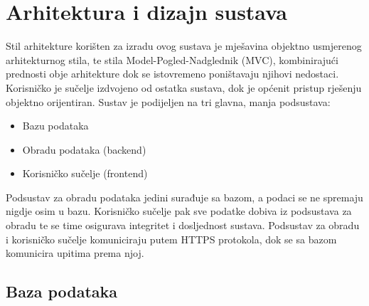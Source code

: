 \chapter{Arhitektura i dizajn sustava}
\setlength{\headheight}{14.49998pt}		


Stil arhitekture korišten za izradu ovog sustava je mješavina objektno usmjerenog arhitekturnog stila, te stila Model-Pogled-Nadglednik (MVC), kombinirajući prednosti obje arhitekture dok se istovremeno poništavaju njihovi nedostaci. Korisničko je sučelje izdvojeno od ostatka sustava, dok je općenit pristup rješenju objektno orijentiran. Sustav je podijeljen na tri glavna, manja podsustava:
\begin{itemize}
\item Bazu podataka
\item Obradu podataka (backend)
\item Korisničko sučelje (frontend)
\end{itemize}
Podsustav za obradu podataka jedini surađuje sa bazom, a podaci se ne spremaju nigdje osim u bazu. Korisničko sučelje pak sve podatke dobiva iz podsustava za obradu te se time osigurava integritet i dosljednost sustava.
Podsustav za obradu i korisničko sučelje komuniciraju putem HTTPS protokola, dok se sa bazom komunicira upitima prema njoj.

				
		\section{Baza podataka}
			
